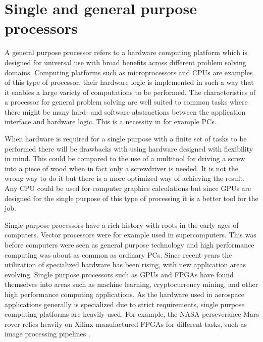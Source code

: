 \documentclass[12pt]{report}
\begin{document}
    \section{Single and general purpose processors}
A general purpose processor refers to a hardware computing platform which is designed for universal use with broad benefits across different problem solving domains. Computing platforms such as microprocessors and CPUs are examples of this type of processor, their hardware logic is implemented in such a way that it enables a large variety of computations to be performed. 
The characteristics of a processor for general problem solving are well suited to common tasks where there might be many hard- and software abstractions between the application interface and hardware logic. This is a necessity in for example PCs.
\par
When hardware is required for a single purpose with a finite set of tasks to be performed there will be drawbacks with using hardware designed with flexibility in mind. This could be compared to the use of a multitool for driving a screw into a piece of wood when in fact only a screwdriver is needed. It is not the wrong way to do it but there is a more optimized way of achieving the result. Any CPU could be used for computer graphics calculations but since GPUs are designed for the single purpose of this type of processing it is a better tool for the job.
\par
Single purpose processors have a rich history with roots in the early ages of computers. Vector processors were for example used in supercomputers.
This was before computers were seen as general purpose technology and high performance computing was about as common as ordinary PCs.
Since recent years the utilization of specialized hardware has been rising, with new application areas evolving. Single purpose processors such as GPUs and FPGAs have found themselves into areas such as machine learning, cryptocurrency mining, and other high performance computing applications.
As the hardware used in aerospace applications generally is specialized due to strict requirements, single purpose computing platforms are heavily used. For example, the NASA perseverance Mars rover relies heavily on Xilinx manufactured FPGAs for different tasks, such as image processing pipelines \citep{XilPerservance}.
\end{document}
